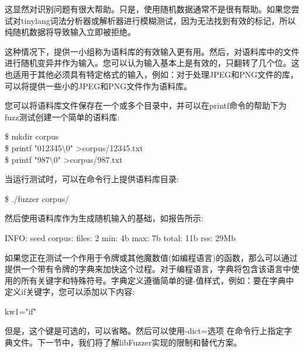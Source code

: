 这显然对识别问题有很大帮助。只是，使用随机数据通常不是很有帮助。如果您尝试对tinylang词法分析器或解析器进行模糊测试，因为无法找到有效的标记，所以纯随机数据将导致输入立即被拒绝。\par

这种情况下，提供一小组称为语料库的有效输入更有用。然后，对语料库中的文件进行随机变异并作为输入。您可以认为输入基本上是有效的，只翻转了几个位。这也适用于其他必须具有特定格式的输入，例如：对于处理JPEG和PNG文件的库，可以将提供一些小的JPEG和PNG文件作为语料库。\par

您可以将语料库文件保存在一个或多个目录中，并可以在printf命令的帮助下为fuzz测试创建一个简单的语料库:\par

\begin{tcolorbox}[colback=white,colframe=black]
\$ mkdir corpus \\
\$ printf "012345$\setminus$0" >corpus/12345.txt \\
\$ printf "987$\setminus$0" >corpus/987.txt
\end{tcolorbox}

当运行测试时，可以在命令行上提供语料库目录:\par

\begin{tcolorbox}[colback=white,colframe=black]
\$ ./fuzzer corpus/
\end{tcolorbox}

然后使用语料库作为生成随机输入的基础，如报告所示:\par

\begin{tcolorbox}[colback=white,colframe=black]
INFO: seed corpus: files: 2 min: 4b max: 7b total: 11b rss: 29Mb
\end{tcolorbox}

如果您正在测试一个作用于令牌或其他魔数值(如编程语言)的函数，那么可以通过提供一个带有令牌的字典来加快这个过程。对于编程语言，字典将包含该语言中使用的所有关键字和特殊符号。字典定义遵循简单的键-值样式，例如：要在字典中定义if关键字，您可以添加以下内容:\par

\begin{tcolorbox}[colback=white,colframe=black]
kw1="if"
\end{tcolorbox}

但是，这个键是可选的，可以省略。然后可以使用-dict=选项 在命令行上指定字典文件。下一节中，我们将了解libFuzzer实现的限制和替代方案。\par

